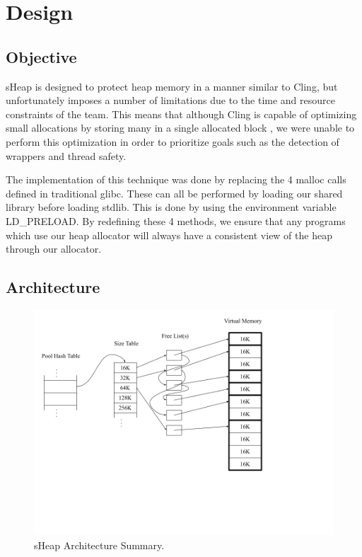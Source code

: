 \documentclass[conference]{IEEEtran}
\begin{document}
\section{Design}

\subsection{Objective}
sHeap is designed to protect heap memory in a manner similar to Cling, but 
unfortunately imposes a number of limitations due to the time and resource 
constraints of the team. This means that although Cling is capable of 
optimizing small allocations by storing many in a single allocated block 
\cite{b1}, we were unable to perform this optimization in order to 
prioritize goals such as the detection of wrappers and thread safety.

The implementation of this technique was done by replacing the 4 malloc 
calls defined in traditional glibc. These can all be performed by loading 
our shared library before loading stdlib. This is done by using the 
environment variable LD\_PRELOAD. By redefining these 4 methods, we ensure 
that any programs which use our heap allocator will always have a 
consistent view of the heap through our allocator.

\subsection{Architecture}

\begin{figure}[htbp]
  \centering
  \includegraphics[width=\linewidth]{sheap_model.png}
  \caption{sHeap Architecture Summary.}
  \label{fig:sheap-model}
\end{figure}
\end{document}
